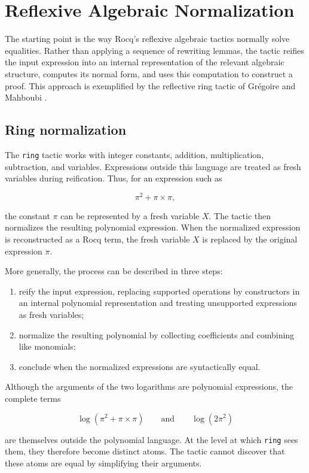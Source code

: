 \documentclass[11pt]{article}
\begin{document}
\section{Reflexive Algebraic Normalization}
The starting point is the way Rocq's reflexive algebraic tactics normally solve
equalities. Rather than applying a sequence of rewriting lemmas, the tactic
reifies the input expression into an internal representation of the relevant
algebraic structure, computes its normal form, and uses this computation to
construct a proof. This approach is exemplified by the reflective ring tactic of Grégoire and Mahboubi \cite{gregoire2005proving}.


\subsection{Ring normalization}

The \texttt{ring} tactic works with integer constants, addition, multiplication, subtraction, and variables. Expressions outside this language are treated as fresh variables during reification. Thus, for an expression such as

$$
  \pi^2+\pi\mathbin{\times}\pi,
$$

the constant $\pi$ can be represented by a fresh variable $X$. The tactic then normalizes the resulting polynomial expression. When the normalized expression is reconstructed as a Rocq term, the fresh variable $X$ is replaced by the original expression $\pi$.

More generally, the process can be described in three steps:
\begin{enumerate}
\item reify the input expression, replacing supported operations by constructors in an internal polynomial representation and treating unsupported expressions as fresh variables;
\item normalize the resulting polynomial by collecting coefficients and combining like monomials;
\item conclude when the normalized expressions are syntactically equal.
\end{enumerate}


Although the arguments of the two logarithms are polynomial expressions, the complete terms

$$
  \log(\pi^2+\pi\mathbin{\times}\pi)
  \qquad\text{and}\qquad
  \log(2\pi^2)
$$

are themselves outside the polynomial language. At the level at which \texttt{ring} sees them, they therefore become distinct atoms. The tactic cannot discover that these atoms are equal by simplifying their arguments.
\end{document}
